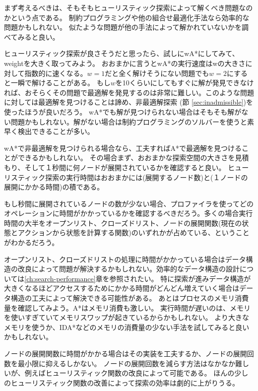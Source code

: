 まず考えるべきは、そもそもヒューリスティック探索によって解くべき問題なのかという点である。
制約プログラミングや他の組合せ最適化手法なら効率的な問題かもしれない。
似たような問題が他の手法によって解かれていないかを調べてみると良い。

ヒューリスティック探索が良さそうだと思ったら、試しにwA*にしてみて、weightを大きく取ってみよう。
おおまかに言うとwA*の実行速度はwの大きさに対して指数的に速くなる。$w=1$だと全く解けそうにない問題でも$w=2$にすると一瞬で解けることがある。
もし$w$を10くらいにしてもすぐに解が発見できなければ、おそらくその問題で最適解を発見するのは非常に難しい。このような問題に対しては最適解を見つけることは諦め、非最適解探索 (節 \ref{sec:inadmissible})を使ったほうが良いだろう。
wA*でも解が見つけられない場合はそもそも解がない問題かもしれない。解がない場合は制約プログラミングのソルバーを使うと素早く検出できることが多い。

wA*で非最適解を見つけられる場合なら、工夫すればA*で最適解を見つけることができるかもしれない。
その場合まず、おおまかな探索空間の大きさを見積もり、そして１秒間に何ノードが展開されているかを確認すると良い。
ヒューリスティック探索の実行時間はおおまかには(展開するノード数)と(１ノードの展開にかかる時間)の積である。

もし秒間に展開されているノードの数が少ない場合、プロファイラを使ってどのオペレーションに時間がかかっているかを確認するべきだろう。多くの場合実行時間の大半をオープンリスト、クローズドリスト、ノードの展開関数(現在の状態とアクションから状態を計算する関数)のいずれかが占めている、ということがわかるだろう。

オープンリスト、クローズドリストの処理に時間がかかっている場合はデータ構造の改良によって問題が解決するかもしれない。効率的なデータ構造の設計については\ref{ch:search-performance}章を参照されたい。
特に探索が進みデータ構造が大きくなるほどアクセスするためにかかる時間がどんどん増えていく場合はデータ構造の工夫によって解決できる可能性がある。
あとはプロセスのメモリ消費量を確認してみよう。A*はメモリ消費も激しい。
実行時間が遅いのは、メモリを使いすぎていてメモリスワップが起きているからかもしれない。
より大きなメモリを使うか、IDA*などのメモリの消費量の少ない手法を試してみると良いかもしれない。

ノードの展開関数に時間がかかる場合はその実装を工夫するか、ノードの展開回数を最小限に抑えるしかない。
ノードの展開回数を減らす方法はなかなか難しいが、例えばヒューリスティック関数の改良によって可能である。
ほんの少しのヒューリスティック関数の改善によって探索の効率は劇的に上がりうる。

